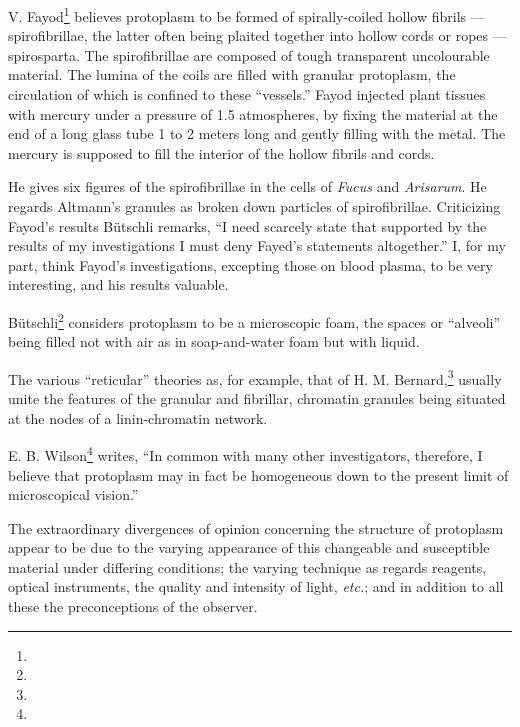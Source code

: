 \documentclass[a4paper, 12pt, oneside]{article}
\begin{document}
V. Fayod\footnote{} believes protoplasm to be formed of spirally-coiled hollow fibrils --- spirofibrillae, the latter often being plaited together into hollow cords or ropes --- spirosparta. The spirofibrillae are composed of tough transparent uncolourable material. The lumina of the coils are filled with granular protoplasm, the circulation of which is confined to these ``vessels.'' Fayod injected plant tissues with mercury under a pressure of 1.5 atmospheres, by fixing the material at the end of a long glass tube 1 to 2 meters long and gently filling with the metal. The mercury is supposed to fill the interior of the hollow fibrils and cords.

He gives six figures of the spirofibrillae in the cells of \emph{Fucus} and \emph{Arisarum}. He regards Altmann's granules as broken down particles of spirofibrillae. Criticizing Fayod's results Bütschli remarks, ``I need scarcely state that supported by the results of my investigations I must deny Fayed's statements altogether.'' I, for my part, think Fayod's investigations, excepting those on blood plasma, to be very interesting, and his results valuable.

Bütschli\footnote{} considers protoplasm to be a microscopic foam, the spaces or ``alveoli'' being filled not with air as in soap-and-water foam but with liquid.

The various ``reticular'' theories as, for example, that of H. M. Bernard,\footnote{} usually unite the features of the granular and fibrillar, chromatin granules being situated at the nodes of a linin-chromatin network.

E. B. Wilson\footnote{} writes, ``In common with many other investigators, therefore, I believe that protoplasm may in fact be homogeneous down to the present limit of microscopical vision.''

The extraordinary divergences of opinion concerning the structure of protoplasm appear to be due to the varying appearance of this changeable and susceptible material under differing conditions; the varying technique as regards reagents, optical instruments, the quality and intensity of light, \emph{etc.}; and in addition to all these the preconceptions of the observer.
\end{document}
